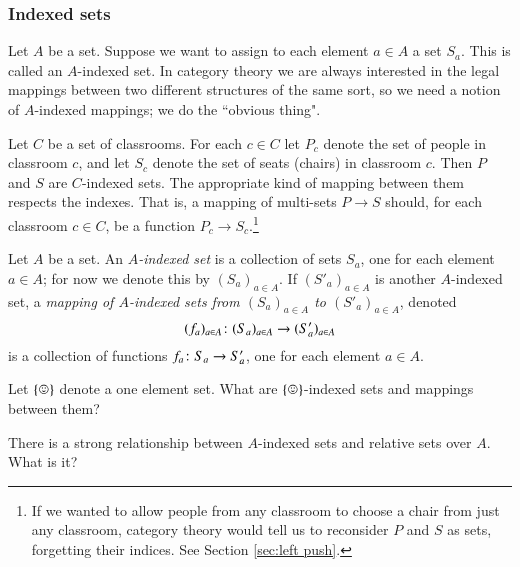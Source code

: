 
\subsubsection{Indexed sets}\label{sec:indexed sets}

Let $A$ be a set. Suppose we want to assign to each element $a\in A$ a set $S_a$. This is called an $A$-indexed set. In category theory we are always interested in the legal mappings between two different structures of the same sort, so we need a notion of $A$-indexed mappings; we do the ``obvious thing".

\begin{example}\label{ex:classroom seats}

Let $C$ be a set of classrooms. For each $c\in C$ let $P_c$ denote the set of people in classroom $c$, and let $S_c$ denote the set of seats (chairs) in classroom $c$. Then $P$ and $S$ are $C$-indexed sets. The appropriate kind of mapping between them respects the indexes. That is, a mapping of multi-sets $P\to S$ should, for each classroom $c\in C$, be a function $P_c\to S_c$.\footnote{If we wanted to allow people from any classroom to choose a chair from just any classroom, category theory would tell us to reconsider $P$ and $S$ as sets, forgetting their indices. See Section \ref{sec:left push}.}

\end{example}

\begin{definition}\label{def:indexed sets}

Let $A$ be a set. An {\em $A$-indexed set} is a collection of sets $S_a$, one for each element $a\in A$; for now we denote this by $(S_a)_{a\in A}$. If $(S'_a)_{a\in A}$ is another $A$-indexed set, a {\em mapping of $A$-indexed sets from $(S_a)_{a\in A}$ to $(S'_a)_{a\in A}$}, denoted $$(f_a)_{a\in A}\colon(S_a)_{a\in A}\rightarrow (S'_a)_{a\in A}$$ is a collection of functions $f_a\colon S_a\rightarrow S'_a$, one for each element $a\in A$.

\end{definition}

\begin{exercise}
Let $\singleton$ denote a one element set. What are $\singleton$-indexed sets and mappings between them?
\end{exercise}

\begin{exercise}
There is a strong relationship between $A$-indexed sets and relative sets over $A$. What is it? 
\end{exercise}



